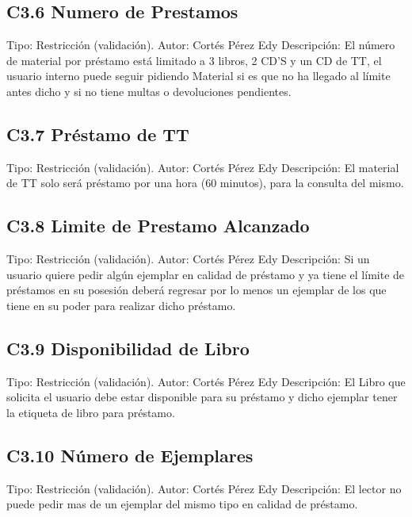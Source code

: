\subsection{C3.6 Numero de Prestamos}
	\UCli Tipo: Restricción (validación).
	\UCli Autor: Cortés Pérez Edy
	\UCli Descripción: El número de material por préstamo está limitado a 3 libros, 2 CD'S y un CD de TT, el usuario interno puede seguir pidiendo Material si es que no ha llegado al límite antes dicho y si no tiene multas o devoluciones pendientes.
	
\subsection{C3.7 Préstamo de TT}
	\UCli Tipo: Restricción (validación).
	\UCli Autor: Cortés Pérez Edy
	\UCli Descripción: El material de TT solo será préstamo por una hora (60 minutos), para la consulta del mismo.

\subsection{C3.8 Limite de Prestamo Alcanzado}
	\UCli Tipo: Restricción (validación).
	\UCli Autor: Cortés Pérez Edy
	\UCli Descripción: Si un usuario quiere pedir algún ejemplar en calidad de préstamo y ya tiene el límite de préstamos en su posesión deberá regresar por lo menos un ejemplar de los que tiene en su poder para realizar dicho préstamo.

\subsection{C3.9 Disponibilidad de Libro}
	\UCli Tipo: Restricción (validación).
	\UCli Autor: Cortés Pérez Edy
	\UCli Descripción: El Libro que solicita el usuario debe estar disponible para su préstamo y dicho ejemplar tener la etiqueta de libro para préstamo.
	
\subsection{C3.10 Número de Ejemplares}
	\UCli Tipo: Restricción (validación).
	\UCli Autor: Cortés Pérez Edy
	\UCli Descripción: El lector no puede pedir mas de un ejemplar del mismo tipo en calidad de préstamo.
	
